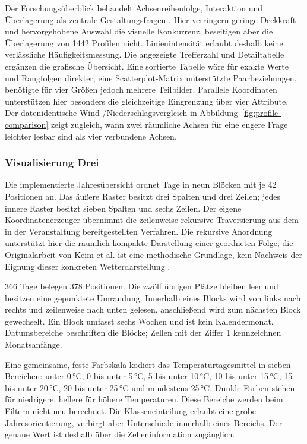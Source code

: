 \documentclass[usegeometry=true]{scrartcl}
\begin{document}
Der Forschungsüberblick behandelt Achsenreihenfolge, Interaktion und
Überlagerung als zentrale Gestaltungsfragen
\autocite[Abschnitte~5--6]{heinrich2013parallel}. Hier verringern geringe
Deckkraft und hervorgehobene Auswahl die visuelle Konkurrenz, beseitigen
aber die Überlagerung von 1442 Profilen nicht. Linienintensität erlaubt
deshalb keine verlässliche Häufigkeitsmessung. Die angezeigte Trefferzahl
und Detailtabelle ergänzen die grafische Übersicht. Eine sortierte Tabelle
wäre für exakte Werte und Rangfolgen direkter; eine Scatterplot-Matrix
unterstützte Paarbeziehungen, benötigte für vier Größen jedoch mehrere
Teilbilder. Parallele Koordinaten unterstützen hier besonders die
gleichzeitige Eingrenzung über vier Attribute. Der datenidentische
Wind-/Niederschlagsvergleich in Abbildung~\ref{fig:profile-comparison}
zeigt zugleich, wann zwei räumliche Achsen für eine engere Frage
leichter lesbar sind als vier verbundene Achsen.
\subsubsection{Visualisierung Drei}
Die implementierte Jahresübersicht ordnet Tage in neun Blöcken mit je
42 Positionen an. Das äußere Raster besitzt drei Spalten und drei Zeilen;
jedes innere Raster besitzt sieben Spalten und sechs Zeilen. Der eigene
Koordinatenerzeuger übernimmt die zeilenweise rekursive Traversierung aus
dem in der Veranstaltung bereitgestellten Verfahren. Die rekursive
Anordnung unterstützt hier die räumlich kompakte Darstellung einer
geordneten Folge; die Originalarbeit von Keim et al. ist eine methodische
Grundlage, kein Nachweis der Eignung dieser konkreten Wetterdarstellung
\autocite{keim1995recursive}.

366 Tage belegen 378 Positionen. Die zwölf übrigen Plätze bleiben leer und
besitzen eine gepunktete Umrandung. Innerhalb eines Blocks wird von links
nach rechts und zeilenweise nach unten gelesen, anschließend wird zum
nächsten Block gewechselt. Ein Block umfasst sechs Wochen und ist kein
Kalendermonat. Datumsbereiche beschriften die Blöcke; Zellen mit der Ziffer
1 kennzeichnen Monatsanfänge.

Eine gemeinsame, feste Farbskala kodiert das Temperaturtagesmittel in sieben
Bereichen: unter 0\,°C, 0 bis unter 5\,°C, 5 bis unter 10\,°C,
10 bis unter 15\,°C, 15 bis unter 20\,°C, 20 bis unter 25\,°C und
mindestens 25\,°C. Dunkle Farben stehen für niedrigere, hellere für höhere
Temperaturen. Diese Bereiche werden beim Filtern nicht neu berechnet.
Die Klasseneinteilung erlaubt eine grobe Jahresorientierung, verbirgt aber
Unterschiede innerhalb eines Bereichs. Der genaue Wert ist deshalb über
die Zelleninformation zugänglich.
\end{document}
